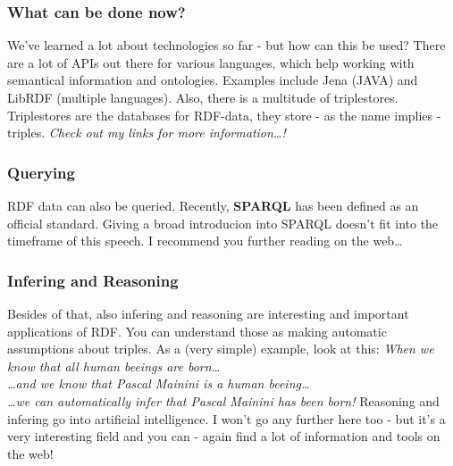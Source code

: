 \documentclass{beamer}
\begin{document}
       \begin{frame}
           \frametitle{What can be done now?}

           We've learned a lot about technologies so far - but how can this be used?
           \vskip 0.3cm
           \pause
           There are a lot of APIs out there for various languages, which help working
           with semantical information and ontologies. Examples include Jena (JAVA) and
           LibRDF (multiple languages).
           \vskip 0.3cm
           \pause
           Also, there is a multitude of triplestores. Triplestores are the databases for
           RDF-data, they store - as the name implies - triples.
           \vskip 0.3cm
           \pause
           \textit{Check out my links for more information\ldots!}
       \end{frame}

       \begin{frame}
           \frametitle{Querying}

           RDF data can also be queried. Recently, \textbf{SPARQL} has been defined as
           an official standard. 
           \vskip 0.3cm
           \pause
           Giving a broad introducion into SPARQL doesn't fit into the timeframe of this
           speech. I recommend you further reading on the web\ldots
       \end{frame}

       \begin{frame}
           \frametitle{Infering and Reasoning}

           Besides of that, also infering and reasoning are interesting and important
           applications of RDF.
           \vskip 0.3cm
           \pause
           You can understand those as making automatic assumptions about triples.
           As a (very simple) example, look at this:
           \vskip 0.3cm
           \pause
           \textit{When we know that all human beeings are born\ldots\\
           \ldots and we know that Pascal Mainini is a human beeing\ldots\\
           \ldots we can automatically infer that Pascal Mainini has been born!}
           \vskip 0.3cm
           \pause
           Reasoning and infering go into artificial intelligence. I won't go any
           further here too - but it's a very interesting field and you can - again
           find a lot of information and tools on the web!
       \end{frame}
\end{document}
